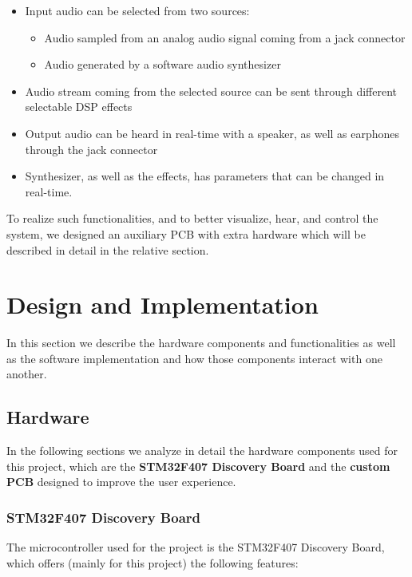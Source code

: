 \begin{itemize}
    \item Input audio can be selected from two sources:
        \begin{itemize}
          \item Audio sampled from an analog audio signal coming from a jack connector
          \item Audio generated by a software audio synthesizer
        \end{itemize}
    \item Audio stream coming from the selected source can be sent through different selectable DSP effects 
    \item Output audio can be heard in real-time with a speaker, as well as earphones through the jack connector
    \item Synthesizer, as well as the effects, has parameters that can be changed in real-time.
\end{itemize}

To realize such functionalities, and to better visualize, hear, and control the system, we designed an auxiliary PCB with extra hardware which will be described in detail in the relative section.

\newpage

\section{Design and Implementation}
\label{sec:Design}
In this section we describe the hardware components and functionalities as well as the software implementation and how those components interact with one another.

\subsection{Hardware}
\label{sec:HW}
In the following sections we analyze in detail the hardware components used for this project, which are the \textbf{STM32F407 Discovery Board} and the \textbf{custom PCB} designed to improve the user experience.

\subsubsection{STM32F407 Discovery Board}
The microcontroller used for the project is the
STM32F407 Discovery Board, which offers (mainly for this project) the following features:

